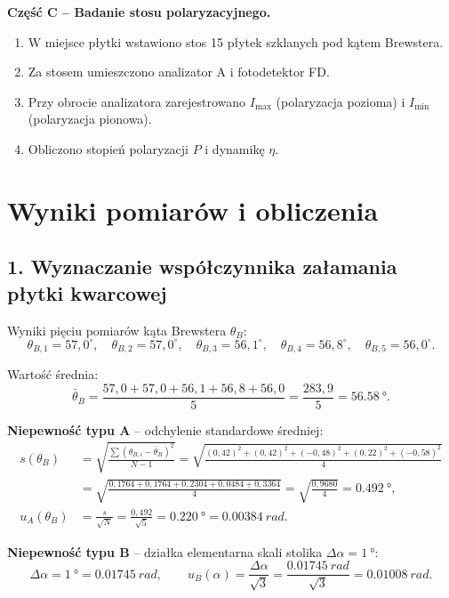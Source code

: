 \documentclass[a4paper,12pt]{article}
\begin{document}
\textbf{Część C -- Badanie stosu polaryzacyjnego.}
\begin{enumerate}
  \item W miejsce płytki wstawiono stos 15 płytek szklanych pod kątem Brewstera.
  \item Za stosem umieszczono analizator A i fotodetektor FD.
  \item Przy obrocie analizatora zarejestrowano $I_{\max}$ (polaryzacja pozioma)
  i $I_{\min}$ (polaryzacja pionowa).
  \item Obliczono stopień polaryzacji $P$ i dynamikę $\eta$.
\end{enumerate}

\section*{Wyniki pomiarów i obliczenia}

\subsection*{1. Wyznaczanie współczynnika załamania płytki kwarcowej}

Wyniki pięciu pomiarów kąta Brewstera $\theta_B$:
\[
\theta_{B,1} = 57{,}0^\circ,\quad
\theta_{B,2} = 57{,}0^\circ,\quad
\theta_{B,3} = 56{,}1^\circ,\quad
\theta_{B,4} = 56{,}8^\circ,\quad
\theta_{B,5} = 56{,}0^\circ.
\]

Wartość średnia:
\[
\bar{\theta}_B = \frac{57{,}0 + 57{,}0 + 56{,}1 + 56{,}8 + 56{,}0}{5}
= \frac{283{,}9}{5} = \SI{56,58}{\degree}.
\]

\textbf{Niepewność typu A} -- odchylenie standardowe średniej:
\begin{align*}
s(\theta_B) &= \sqrt{\frac{\sum(\theta_{B,i}-\bar{\theta}_B)^2}{N-1}}
= \sqrt{\frac{(0{,}42)^2 + (0{,}42)^2 + (-0{,}48)^2 + (0{,}22)^2 + (-0{,}58)^2}{4}} \\
&= \sqrt{\frac{0{,}1764 + 0{,}1764 + 0{,}2304 + 0{,}0484 + 0{,}3364}{4}}
= \sqrt{\frac{0{,}9680}{4}} = \SI{0,492}{\degree}, \\[4pt]
u_A(\theta_B) &= \frac{s}{\sqrt{N}} = \frac{0{,}492}{\sqrt{5}}
= \SI{0,220}{\degree} = \SI{0,00384}{rad}.
\end{align*}

\textbf{Niepewność typu B} -- działka elementarna skali stolika $\Delta\alpha = \SI{1}{\degree}$:
\[
\Delta\alpha = \SI{1}{\degree} = \SI{0,01745}{rad},\qquad
u_B(\alpha) = \frac{\Delta\alpha}{\sqrt{3}} = \frac{\SI{0,01745}{rad}}{\sqrt{3}}
= \SI{0,01008}{rad}.
\]
\end{document}
